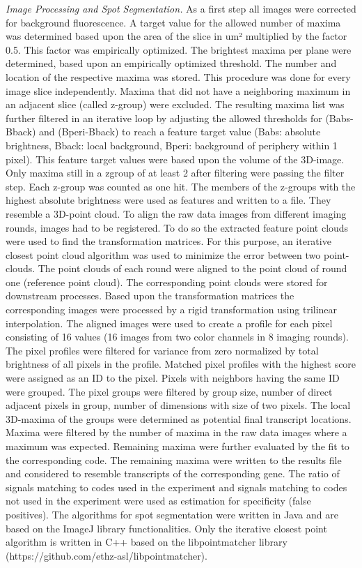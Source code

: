\textit{Image Processing and Spot Segmentation.} As a first step all images were corrected for background fluorescence. A target value for the allowed number of maxima was determined based upon the area of the slice in um² multiplied by the factor 0.5. This factor was empirically optimized. The brightest maxima per plane were determined, based upon an empirically optimized threshold. The number and location of the respective maxima was stored. This procedure was done for every image slice independently. Maxima that did not have a neighboring maximum in an adjacent slice (called z-group) were excluded. The resulting maxima list was further filtered in an iterative loop by adjusting the allowed thresholds for (Babs-Bback) and (Bperi-Bback) to reach a feature target value (Babs: absolute brightness, Bback: local background, Bperi: background of periphery within 1 pixel). This feature target values were based upon the volume of the 3D-image. Only maxima still in a zgroup of at least 2 after filtering were passing the filter step. Each z-group was counted as one hit. The members of the z-groups with the highest absolute brightness were used as features and written to a file. They resemble a 3D-point cloud. To align the raw data images from different imaging rounds, images had to be registered. To do so the extracted feature point clouds were used to find the transformation matrices. For this purpose, an iterative closest point cloud algorithm was used to minimize the error between two point-clouds. The point clouds of each round were aligned to the point cloud of round one (reference point cloud). The corresponding point clouds were stored for downstream processes. Based upon the transformation matrices the corresponding images were processed by a rigid transformation using trilinear interpolation. The aligned images were used to create a profile for each pixel consisting of 16 values (16 images from two color channels in 8 imaging rounds). The pixel profiles were filtered for variance from zero normalized by total brightness of all pixels in the profile. Matched pixel profiles with the highest score were assigned as an ID to the pixel. Pixels with neighbors having the same ID were grouped. The pixel groups were filtered by group size, number of direct adjacent pixels in group, number of dimensions with size of two pixels. The local 3D-maxima of the groups were determined as potential final transcript locations. Maxima were filtered by the number of maxima in the raw data images where a maximum was expected. Remaining maxima were further evaluated by the fit to the corresponding code. The remaining maxima were written to the results file and considered to resemble transcripts of the corresponding gene. The ratio of signals matching to codes used in the experiment and signals matching to codes not used in the experiment were used as estimation for specificity (false positives). The algorithms for spot segmentation were written in Java and are based on the ImageJ library functionalities. Only the iterative closest point algorithm is written in C++ based on the libpointmatcher library (https://github.com/ethz-asl/libpointmatcher).

